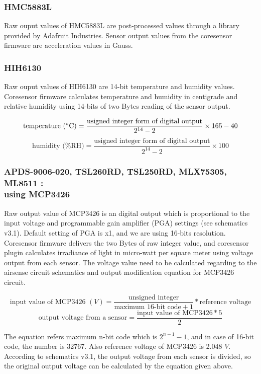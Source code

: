 \subsubsection{ HMC5883L}

Raw ouput values of HMC5883L are post-processed values through a library provided by Adafruit Industries. Sensor output values from the coresensor firmware are acceleration values in Gauss.

\subsubsection{ HIH6130}

Raw ouput values of HIH6130 are 14-bit temperature and humidity values. Coresensor firmware calculates temperature and humidity in centigrade and relative humidity using 14-bits of two Bytes reading of the sensor output.

{\centering
 \[ \text{temperature (\degree C)} = \frac{\text{usigned integer form of digital output}}{2^{14} - 2} \times 165 - 40 \] 
 \[ \text{humidity (\%RH)} = \frac{\text{usigned integer form of digital output}}{2^{14} - 2} \times 100 \]
 \par
 }


\subsubsection[MCP3426]{ APDS-9006-020, TSL260RD, TSL250RD, MLX75305, ML8511 : \\ using MCP3426}

Raw output value of MCP3426 is an digital output which is proportional to the input voltage and programmable gain amplifier (PGA) settings (see schematics v3.1). Default setting of PGA is x1, and we are using 16-bits resolution. Coresensor firmware delivers the two Bytes of raw integer value, and coresensor plugin calculates irradiance of light in micro-watt per square meter using voltage output from each sensor. The voltage value need to be calculated regarding to the airsense circuit schematics and output modification equation for MCP3426 circuit.

{\centering
 \[ \text{input value of MCP3426 }(V) = \frac{\text{unsigned integer}}{\text{maximum 16-bit code} + 1} * \text{reference voltage} \]
 \[ \text{output voltage from a sensor} = \frac{\text{input value of MCP3426} * 5}{2} \]
 \par
 }

\bigbreak
The equation refers maximum n-bit code which is \( 2^{n - 1} - 1 \), and in case of 16-bit code, the number is 32767. Also reference voltage of MCP3426 is 2.048 \(V\). According to schematics v3.1, the output voltage from each sensor is divided, so the original output voltage can be calculated by the equation given above.


